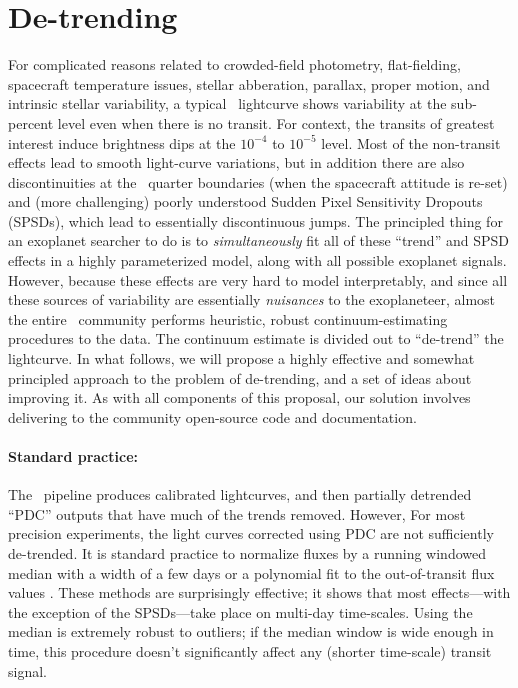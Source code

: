 \documentclass[letterpaper,12pt,preprint]{hack_aastex}
\begin{document}
\section{De-trending}

For complicated reasons related to crowded-field photometry, flat-fielding,
spacecraft temperature issues, stellar abberation, parallax, proper motion,
and intrinsic stellar variability, a typical \Kepler\ lightcurve shows
variability at the sub-percent level even when there is no transit.
For context, the transits of greatest interest induce brightness dips at the
$10^{-4}$ to $10^{-5}$ level.
Most of the non-transit effects lead to smooth light-curve variations, but in addition
there are also discontinuities at the \Kepler\ quarter boundaries (when the
spacecraft attitude is re-set) and (more challenging) poorly understood Sudden Pixel
Sensitivity Dropouts (SPSDs), which lead to essentially discontinuous jumps.
The principled thing for an exoplanet searcher to do is to \emph{simultaneously}
fit all of these ``trend'' and SPSD effects in a highly parameterized model,
along with all possible exoplanet signals.
However, because these effects are very hard to model interpretably, and since
all these sources of variability are essentially \emph{nuisances} to the
exoplaneteer, almost the entire \Kepler\ community performs heuristic, robust
continuum-estimating procedures to the data.
The continuum estimate is divided out to ``de-trend'' the lightcurve.
In what follows, we will propose a highly effective and somewhat principled
approach to the problem of de-trending, and a set of ideas about improving it.
As with all components of this proposal, our solution involves delivering to the
community open-source code and documentation.

\paragraph{Standard practice:}
The \Kepler\ pipeline produces calibrated lightcurves, and then partially
detrended ``PDC'' outputs that have much of the trends removed.
However, For most precision experiments, the light curves corrected using PDC
are not sufficiently de-trended.
It is standard practice to normalize fluxes by a
running windowed median with a width of a few days \citep{dressing} or a
polynomial fit to the out-of-transit flux values \citep[regions chosen by
hand][]{autokep}.
These methods are surprisingly effective; it shows that most effects---with
the exception of the SPSDs---take place on multi-day time-scales.
Using the median is extremely robust to outliers; if the median window is
wide enough in time, this procedure doesn't significantly affect any (shorter
time-scale) transit signal.
\end{document}
